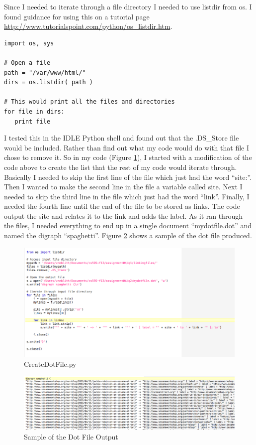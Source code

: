\documentclass{article}
\begin{document}
Since I needed to iterate through a file directory I needed to use listdir from os. I found guidance for using this on a tutorial page \url{http://www.tutorialspoint.com/python/os_listdir.htm}.

\begin{verbatim}
import os, sys

# Open a file
path = "/var/www/html/"
dirs = os.listdir( path )

# This would print all the files and directories
for file in dirs:
   print file
\end{verbatim}

I tested this in the IDLE Python shell and found out that the .DS\_Store file would be included. Rather than find out what my code would do with that file I chose to remove it. So in my code (Figure \ref{createdotfile}), I started with a modification of the code above to create the list that the rest of my code would iterate through. Basically I needed to skip the first line of the file which just had the word ``site:''. Then I wanted to make the second line in the file a variable called site. Next I needed to skip the third line in the file which just had the word ``link''. Finally, I needed the fourth line until the end of the file to be stored as links. The code output the site and relates it to the link and adds the label. As it ran through the files, I needed everything to end up in a single document ``mydotfile.dot'' and named the digraph ``spaghetti''. Figure \ref{dotfileexample} shows a sample of the dot file produced.

\begin{figure}[H]
\centering
\includegraphics[scale=0.50]{q2/createdotfilecode}
\caption{CreateDotFile.py}
\label{createdotfile}
\end{figure}

\begin{figure}[H]
\centering
\includegraphics[scale=0.40]{q2/sampledotfileoutput}
\caption{Sample of the Dot File Output}
\label{dotfileexample}
\end{figure}
\end{document}
